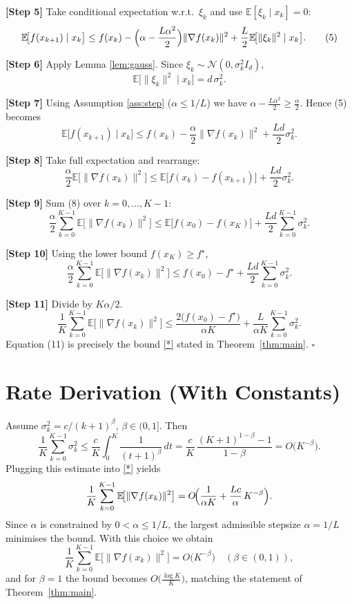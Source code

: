 \documentclass[11pt]{article}
\newcommand{\E}{\mathbb{E}}
\begin{document}
\noindent\textbf{[Step 5]} Take conditional expectation w.r.t.\ $\xi_{k}$ and use $\E[\xi_{k}\mid x_{k}]=0$:
\[
\E\!\bigl[f(x_{k+1})\mid x_{k}\bigr]\le 
f(x_{k})-\Bigl(\alpha-\frac{L\alpha^{2}}{2}\Bigr)\|\nabla f(x_{k})\|^{2}
+\frac{L}{2}\E\!\bigl[\|\xi_{k}\|^{2}\mid x_{k}\bigr].
\tag{5}
\]

\noindent\textbf{[Step 6]} Apply Lemma \ref{lem:gauss}. Since $\xi_{k}\sim\mathcal N(0,\sigma_{k}^{2}I_{d})$,
\[
\E\!\bigl[\|\xi_{k}\|^{2}\mid x_{k}\bigr]=d\,\sigma_{k}^{2}.
\tag{6}
\]

\noindent\textbf{[Step 7]} Using Assumption \ref{ass:step} ($\alpha\le 1/L$) we have $\alpha-\frac{L\alpha^{2}}{2}\ge \frac{\alpha}{2}$. Hence (5) becomes
\[
\E\!\bigl[f(x_{k+1})\mid x_{k}\bigr]\le 
f(x_{k})-\frac{\alpha}{2}\|\nabla f(x_{k})\|^{2}
+\frac{L d}{2}\sigma_{k}^{2}.
\tag{7}
\]

\noindent\textbf{[Step 8]} Take full expectation and rearrange:
\[
\frac{\alpha}{2}\E\!\bigl[\|\nabla f(x_{k})\|^{2}\bigr]
\le \E\!\bigl[f(x_{k})-f(x_{k+1})\bigr]+\frac{L d}{2}\sigma_{k}^{2}.
\tag{8}
\]

\noindent\textbf{[Step 9]} Sum (8) over $k=0,\dots,K-1$:
\[
\frac{\alpha}{2}\sum_{k=0}^{K-1}\E\!\bigl[\|\nabla f(x_{k})\|^{2}\bigr]
\le \E\!\bigl[f(x_{0})-f(x_{K})\bigr]+\frac{L d}{2}\sum_{k=0}^{K-1}\sigma_{k}^{2}.
\tag{9}
\]

\noindent\textbf{[Step 10]} Using the lower bound $f(x_{K})\ge f^{\star}$,
\[
\frac{\alpha}{2}\sum_{k=0}^{K-1}\E\!\bigl[\|\nabla f(x_{k})\|^{2}\bigr]
\le f(x_{0})-f^{\star}+\frac{L d}{2}\sum_{k=0}^{K-1}\sigma_{k}^{2}.
\tag{10}
\]

\noindent\textbf{[Step 11]} Divide by $K\alpha/2$.
\[
\frac{1}{K}\sum_{k=0}^{K-1}\E\!\bigl[\|\nabla f(x_{k})\|^{2}\bigr]
\le \frac{2\bigl(f(x_{0})-f^{\star}\bigr)}{\alpha K}
+\frac{L}{\alpha K}\sum_{k=0}^{K-1}\sigma_{k}^{2}.
\tag{11}
\]
Equation (11) is precisely the bound \eqref{*} stated in Theorem~\ref{thm:main}. \hfill $\square$

\section*{Rate Derivation (With Constants)}
Assume $\sigma_{k}^{2}=c/(k+1)^{\beta}$, $\beta\in(0,1]$. Then
\[
\frac{1}{K}\sum_{k=0}^{K-1}\sigma_{k}^{2}
\le \frac{c}{K}\int_{0}^{K}\frac{1}{(t+1)^{\beta}}\,dt
= \frac{c}{K}\,\frac{(K+1)^{1-\beta}-1}{1-\beta}
= O\!\bigl(K^{-\beta}\bigr).
\]
Plugging this estimate into \eqref{*} yields
\[
\frac{1}{K}\sum_{k=0}^{K-1}\E\!\bigl[\|\nabla f(x_{k})\|^{2}\bigr]
= O\!\Bigl(\frac{1}{\alpha K}+\frac{L c}{\alpha}\,K^{-\beta}\Bigr).
\]
Since $\alpha$ is constrained by $0<\alpha\le 1/L$, the largest admissible stepsize $\alpha=1/L$ minimises the bound. With this choice we obtain
\[
\frac{1}{K}\sum_{k=0}^{K-1}\E\!\bigl[\|\nabla f(x_{k})\|^{2}\bigr]
= O\!\bigl(K^{-\beta}\bigr)\quad(\beta\in(0,1)),
\]
and for $\beta=1$ the bound becomes $O\!\bigl(\tfrac{\log K}{K}\bigr)$, matching the statement of Theorem~\ref{thm:main}.
\end{document}
